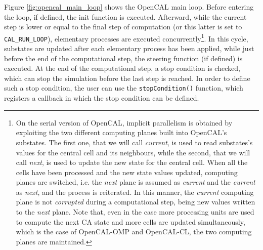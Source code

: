 Figure \ref{fig:opencal_main_loop} shows the OpenCAL main loop. Before
entering the loop, if defined, the init function is
executed. Afterward, while the current step is lower or equal to the
final step of computation (or this latter is set to
\verb'CAL_RUN_LOOP'), elementary processes are executed
concurrently\footnote{On the serial version of OpenCAL, implicit
  parallelism is obtained by exploiting the two different computing
  planes built into OpenCAL's substates. The first one, that we will
  call \emph{current}, is used to read substates's values for the
  central cell and its neighbours, while the second, that we will call
  \emph{next}, is used to update the new state for the central
  cell. When all the cells have been processed and the new state
  values updated, computing planes are switched, i.e. the \emph{next}
  plane is assumed as \emph{current} and the \emph{current} as
  \emph{next}, and the process is reiterated. In this manner, the
  \emph{current} computing plane is not \emph{corrupted} during a
  computational step, being new values written to the \emph{next}
  plane. Note that, even in the case more processing units are used to
  compute the next CA state and more cells are updated simultaneously,
  which is the case of OpenCAL-OMP and OpenCAL-CL, the two computing
  planes are maintained.}. In this cycle, substates are updated after
each elementary process has been applied, while just before the end of
the computational step, the steering function (if defined) is
executed. At the end of the computational step, a stop condition is
checked, which can stop the simulation before the last step is
reached. In order to define such a stop condition, the user can use
the \verb'stopCondition()' function, which registers a callback in
which the stop condition can be defined.

